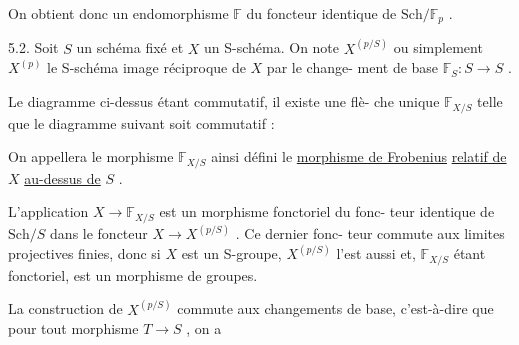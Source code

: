 
On obtient donc un endomorphisme $\mathbb{F}$ du foncteur identique de $\mathrm{Sch}/\mathbb{F}_p$ .

5.2. Soit $S$ un schéma fixé et $X$ un S-schéma. On note $X^{(p/S)}$
ou simplement $X^{(p)}$ le S-schéma image réciproque de $X$ par le change-%
ment de base $\mathbb{F}_S : S \to S$ .

Le diagramme ci-dessus étant commutatif, il existe une flè-%
che unique $\mathbb{F}_{X/S}$ telle que le diagramme suivant soit commutatif :


On appellera le morphisme $\mathbb{F}_{X/S}$ ainsi défini le \uline{morphisme de Frobenius}
\uline{relatif de} $X$ \uline{au-dessus de} $S$ .

L'application $X \to \mathbb{F}_{X/S}$ est un morphisme fonctoriel du fonc-%
teur identique de $\mathrm{Sch}/S$ dans le foncteur $X \to X^{(p/S)}$ . Ce dernier fonc-%
teur commute aux limites projectives finies, donc si $X$ est un S-groupe,
$X^{(p/S)}$ l'est aussi et, $\mathbb{F}_{X/S}$ étant fonctoriel, est un morphisme de groupes.

La construction de $X^{(p/S)}$ commute aux changements de base,
c'est-à-dire que pour tout morphisme $T \to S$ , on a

